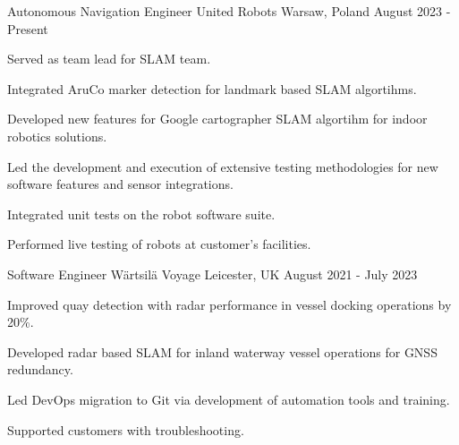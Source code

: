 

\begin{cventries}

  \cventry
    {Autonomous Navigation Engineer} %
    {United Robots} %
    {Warsaw, Poland} %
    {August 2023 - Present} %
    {
      \begin{cvitems} %
        \item {Served as team lead for SLAM team.}
        \item {Integrated AruCo marker detection for landmark based SLAM algortihms.}
        \item {Developed new features for Google cartographer SLAM algortihm for indoor robotics solutions.}
        \item {Led the development and execution of extensive testing methodologies for new software features and sensor integrations.}
        \item {Integrated unit tests on the robot software suite.}
        \item {Performed live testing of robots at customer's facilities.}
      \end{cvitems}
    }

  \cventry
    {Software Engineer} %
    {Wärtsilä Voyage} %
    {Leicester, UK} %
    {August 2021 - July 2023} %
    {
      \begin{cvitems} %
        \item {Improved quay detection with radar performance in vessel docking operations by 20\%.}
        \item {Developed radar based SLAM for inland waterway vessel operations for GNSS redundancy.}
        \item {Led DevOps migration to Git via development of automation tools and training.}
        \item {Supported customers with troubleshooting.}
      \end{cvitems}
    }


\end{cventries}
